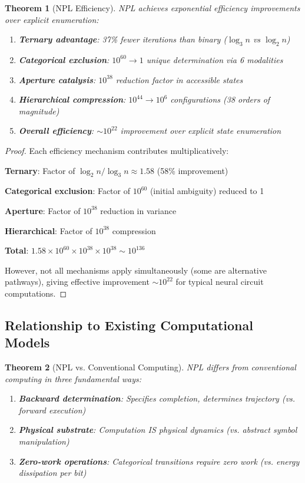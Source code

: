 \documentclass[aps,prd,twocolumn,superscriptaddress,floatfix,nofootinbib]{revtex4-2}
\newtheorem{theorem}{Theorem}[section]
\theoremstyle{remark}
\begin{document}
\begin{theorem}[NPL Efficiency]
\label{thm:npl_efficiency}
NPL achieves exponential efficiency improvements over explicit enumeration:
\begin{enumerate}
\item \textbf{Ternary advantage}: 37\% fewer iterations than binary ($\log_3 n$ vs $\log_2 n$)
\item \textbf{Categorical exclusion}: $10^{60} \to 1$ unique determination via 6 modalities
\item \textbf{Aperture catalysis}: $10^{38}$ reduction factor in accessible states
\item \textbf{Hierarchical compression}: $10^{44} \to 10^6$ configurations (38 orders of magnitude)
\item \textbf{Overall efficiency}: $\sim 10^{22}$ improvement over explicit state enumeration
\end{enumerate}
\end{theorem}

\begin{proof}
Each efficiency mechanism contributes multiplicatively:

\textbf{Ternary}: Factor of $\log_2 n / \log_3 n \approx 1.58$ (58\% improvement)

\textbf{Categorical exclusion}: Factor of $10^{60}$ (initial ambiguity) reduced to 1

\textbf{Aperture}: Factor of $10^{38}$ reduction in variance

\textbf{Hierarchical}: Factor of $10^{38}$ compression

\textbf{Total}: $1.58 \times 10^{60} \times 10^{38} \times 10^{38} \sim 10^{136}$

However, not all mechanisms apply simultaneously (some are alternative pathways), giving effective improvement $\sim 10^{22}$ for typical neural circuit computations.
\end{proof}

\subsection{Relationship to Existing Computational Models}

\begin{theorem}[NPL vs. Conventional Computing]
\label{thm:npl_vs_conventional}
NPL differs from conventional computing in three fundamental ways:
\begin{enumerate}
\item \textbf{Backward determination}: Specifies completion, determines trajectory (vs. forward execution)
\item \textbf{Physical substrate}: Computation IS physical dynamics (vs. abstract symbol manipulation)
\item \textbf{Zero-work operations}: Categorical transitions require zero work (vs. energy dissipation per bit)
\end{enumerate}
\end{theorem}
\end{document}
